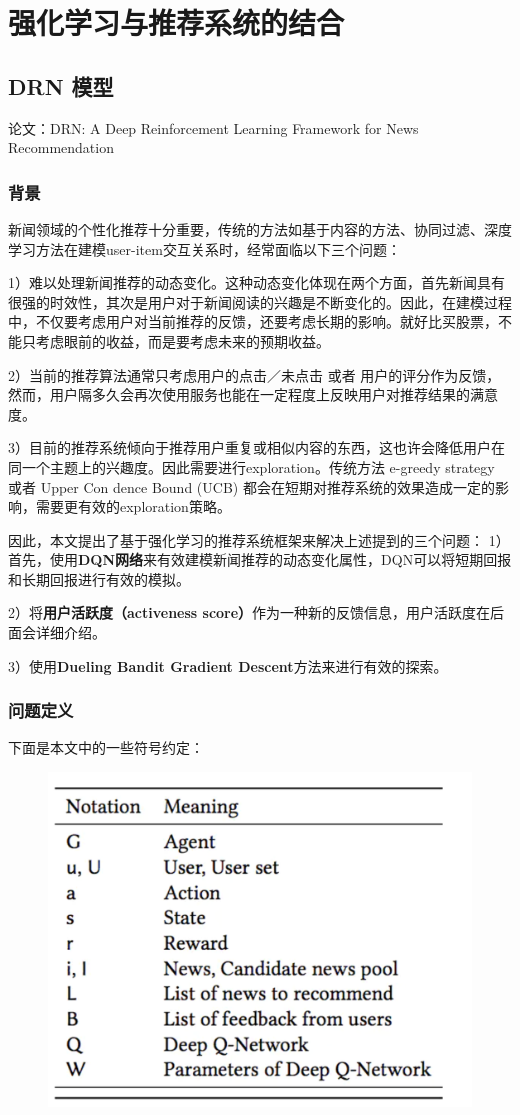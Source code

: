 \documentclass[12pt]{article}
\begin{document}
\section{强化学习与推荐系统的结合}
\subsection{DRN 模型\cite{Recommender_System_With_Deep_Learning_DRN}}
论文：DRN: A Deep Reinforcement Learning Framework for News Recommendation

\subsubsection{背景}
新闻领域的个性化推荐十分重要，传统的方法如基于内容的方法、协同过滤、深度学习方法在建模user-item交互关系时，经常面临以下三个问题：

1）难以处理新闻推荐的动态变化。这种动态变化体现在两个方面，首先新闻具有很强的时效性，其次是用户对于新闻阅读的兴趣是不断变化的。因此，在建模过程中，不仅要考虑用户对当前推荐的反馈，还要考虑长期的影响。就好比买股票，不能只考虑眼前的收益，而是要考虑未来的预期收益。

2）当前的推荐算法通常只考虑用户的点击／未点击 或者 用户的评分作为反馈，然而，用户隔多久会再次使用服务也能在一定程度上反映用户对推荐结果的满意度。

3）目前的推荐系统倾向于推荐用户重复或相似内容的东西，这也许会降低用户在同一个主题上的兴趣度。因此需要进行exploration。传统方法 e-greedy strategy 或者 Upper Con dence Bound (UCB) 都会在短期对推荐系统的效果造成一定的影响，需要更有效的exploration策略。

因此，本文提出了基于强化学习的推荐系统框架来解决上述提到的三个问题：
1）首先，使用\textbf{DQN网络}来有效建模新闻推荐的动态变化属性，DQN可以将短期回报和长期回报进行有效的模拟。

2）将\textbf{用户活跃度（activeness score）}作为一种新的反馈信息，用户活跃度在后面会详细介绍。

3）使用\textbf{Dueling Bandit Gradient Descent}方法来进行有效的探索。

\subsubsection{问题定义}
下面是本文中的一些符号约定：
\begin{figure}[H]
    \centering
    \includegraphics[width=.4\textwidth]{fig/DRN_Notations.png}
\end{figure}
\end{document}
